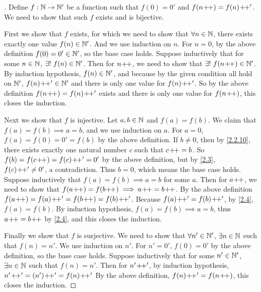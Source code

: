 \begin{proof}[]
	Define \(f : \mathbb{N} \to \mathbb{N}'\) be a function such that \(f(0) = 0'\) and \(f(n\!+\!\!+) = f(n)\!+\!\!+'\).
	We need to show that such \(f\) exists and is bijective.

	First we show that \(f\) exists, for which we need to show that \(\forall n \in \mathbb{N}\), there exists exactly one value \(f(n) \in \mathbb{N}'\).
	And we use induction on \(n\).
	For \(n = 0\), by the above definition \(f(0) = 0' \in \mathbb{N}'\), so the base case holds.
	Suppose inductively that for some \(n \in \mathbb{N}\), \(\exists!\ f(n) \in \mathbb{N}'\).
	Then for \(n\!+\!\!+\), we need to show that \(\exists!\ f(n\!+\!\!+) \in \mathbb{N}'\).
	By induction hypothesis, \(f(n) \in \mathbb{N}'\), and because by the given condition  all hold on \(\mathbb{N}'\), \(f(n)\!+\!\!+' \in \mathbb{N}'\) and there is only one value for \(f(n)\!+\!\!+'\).
	So by the above definition \(f(n\!+\!\!+) = f(n)\!+\!\!+'\) exists and there is only one value for \(f(n\!+\!\!+)\), this closes the induction.

	Next we show that \(f\) is injective.
	Let \(a, b \in \mathbb{N}\) and \(f(a) = f(b)\).
	We claim that \(f(a) = f(b) \implies a = b\), and we use induction on \(a\).
	For \(a = 0\), \(f(a) = f(0) = 0' = f(b)\) by the above definition.
	If \(b \neq 0\), then by \cref{2.2.10}, there exists exactly one natural number \(c\) such that \(c\!+\!\!+ = b\).
	So \(f(b) = f(c\!+\!\!+) = f(c)\!+\!\!+' = 0'\) by the above definition, but by \cref{2.3}, \(f(c)\!+\!\!+' \neq 0'\), a contradiction.
	Thus \(b = 0\), which means the base case holds.
	Suppose inductively that \(f(a) = f(b) \implies a = b\) for some \(a\).
	Then for \(a\!+\!\!+\), we need to show that \(f(a\pp) = f(b\pp) \implies a\pp = b\pp\).
	By the above definition \(f(a\pp) = f(a)\pp' = f(b\pp) = f(b)\pp'\).
	Because \(f(a)\!+\!\!+' = f(b)\!+\!\!+'\), by \cref{2.4}, \(f(a) = f(b)\).
	By induction hypothesis, \(f(a) = f(b) \implies a = b\), thus \(a\!+\!\!+ = b\!+\!\!+\) by \cref{2.4}, and this closes the induction.

	Finally we show that \(f\) is surjective.
	We need to show that \(\forall n' \in \mathbb{N}'\), \(\exists n \in \mathbb{N}\) such that \(f(n) = n'\).
	We use induction on \(n'\).
	For \(n' = 0'\), \(f(0) = 0'\) by the above definition, so the base case holds.
	Suppose inductively that for some \(n' \in \mathbb{N}'\), \(\exists n \in \mathbb{N}\) such that \(f(n) = n'\).
	Then for \(n'\!+\!\!+'\), by induction hypothesis, \(n'\pp' = (n')\pp' = f(n)\pp'\)
	By the above definition, \(f(n)\!+\!\!+' = f(n\!+\!\!+)\), this closes the induction.
\end{proof}
